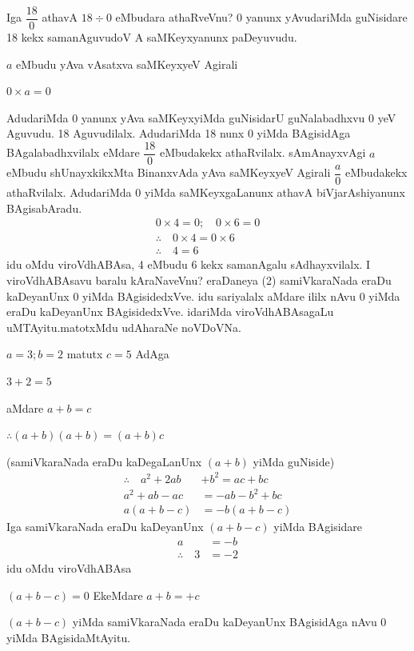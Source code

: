 Iga $\dfrac{18}{0}$ athavA $18\div 0$ eMbudara athaRveVnu? {\rm 0} yanunx yAvudariMda guNisidare {\rm 18} kekx samanAguvudoV A saMKeyxyanunx paDeyuvudu.

 $a$ eMbudu yAva vAsatxva saMKeyxyeV Agirali
\begin{center}
$0\times a=0$
\end{center}
AdudariMda {\rm 0} yanunx yAva saMKeyxyiMda guNisidarU guNalabadhxvu {\rm 0} yeV Aguvudu. {\rm 18} Aguvudilalx. AdudariMda {\rm 18} nunx {\rm 0} yiMda BAgisidAga BAgalabadhxvilalx eMdare $\dfrac{18}{0}$ eMbudakekx athaRvilalx. sAmAnayxvAgi $a$ eMbudu shUnayxkikxMta BinanxvAda yAva saMKeyxyeV Agirali $\dfrac{a}{0}$ eMbudakekx athaRvilalx. AdudariMda {\rm 0} yiMda  saMKeyxgaLanunx athavA biVjarAshiyanunx BAgisabAradu.
\begin{gather*}
0\times 4=0; \quad 0\times 6=0\tag{\rm 1}\\
\therefore \quad 0\times 4=0\times 6 \quad \tag{\rm 2}\\
\therefore \quad 4=6 \quad \tag{\rm 3}  
\end{gather*}
idu oMdu viroVdhABAsa, {\rm 4} eMbudu {\rm 6} kekx samanAgalu sAdhayxvilalx.\break 
I viroVdhABAsavu baralu kAraNaveVnu? eraDaneya {\rm (2)} samiVkaraNada eraDu kaDeyanUnx {\rm 0} yiMda BAgisidedxVve. idu sariyalalx aMdare ililx nAvu {\rm 0} yiMda eraDu kaDeyanUnx BAgisidedxVve. idariMda viroVdhABAsagaLu uMTAyitu.\break matotxMdu udAharaNe noVDoVNa.
\begin{center}
$a=3 ; b=2$ \quad matutx \quad $c=5$ \quad AdAga

$3+2=5$

aMdare \quad $a+b=c$

$\therefore (a+b)(a+b)=(a+b)c$
\end{center}
(samiVkaraNada eraDu kaDegaLanUnx $(a+b)$ yiMda guNiside)
\begin{align*}
\therefore \quad a^2+2ab&+b^2=ac+bc\\
a^2+ab-ac&=-ab-b^2+bc\\
a(a+b-c)&=-b(a+b-c)
\end{align*}
Iga samiVkaraNada eraDu kaDeyanUnx $(a+b-c)$ yiMda BAgisidare
\begin{align*}
a&=-b\\
\therefore \quad 3&=-2
\end{align*}
idu oMdu viroVdhABAsa

$(a+b-c)=0$ \quad EkeMdare \quad $a+b=+c$

$(a+b-c)$ yiMda samiVkaraNada eraDu kaDeyanUnx BAgisidAga nAvu {\rm 0} yiMda BAgisidaMtAyitu.


